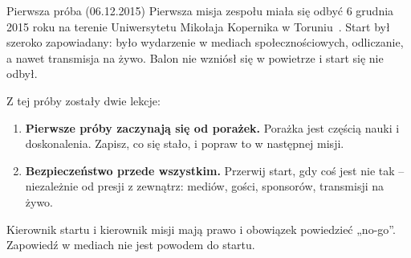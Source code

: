 \clearpage
\begin{sekcja}{Pierwsza próba (06.12.2015)}\label{sec:proba2015}
Pierwsza misja zespołu miała się odbyć 6 grudnia 2015 roku na terenie Uniwersytetu Mikołaja Kopernika w Toruniu~\cite{fbsimle}. Start był szeroko zapowiadany: było wydarzenie w mediach społecznościowych, odliczanie, a nawet transmisja na żywo. Balon nie wzniósł się w powietrze i start się nie odbył.

Z tej próby zostały dwie lekcje:
\begin{enumerate}
  \item \textbf{Pierwsze próby zaczynają się od porażek.} Porażka jest częścią nauki i doskonalenia. Zapisz, co się stało, i popraw to w następnej misji.
  \item \textbf{Bezpieczeństwo przede wszystkim.} Przerwij start, gdy coś jest nie tak -- niezależnie od presji z zewnątrz: mediów, gości, sponsorów, transmisji na żywo.
\end{enumerate}
\begin{uwaga}Kierownik startu i kierownik misji mają prawo i obowiązek powiedzieć „no-go”. Zapowiedź w mediach nie jest powodem do startu.\end{uwaga}

\end{sekcja}

